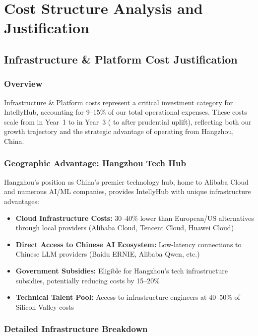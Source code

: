 \documentclass[11pt, a4paper, oneside]{article}
\begin{document}
\restoregeometry
\endgroup

\section{Cost Structure Analysis and Justification}
\label{sec:cost-analysis}

\subsection{Infrastructure \& Platform Cost Justification}

\subsubsection{Overview}
Infrastructure \& Platform costs represent a critical investment category for IntellyHub, accounting for 9--15\% of our total operational expenses. These costs scale from  in Year~1 to  in Year~3 ( to  after prudential uplift), reflecting both our growth trajectory and the strategic advantage of operating from Hangzhou, China.

\subsubsection{Geographic Advantage: Hangzhou Tech Hub}
Hangzhou's position as China's premier technology hub, home to Alibaba Cloud and numerous AI/ML companies, provides IntellyHub with unique infrastructure advantages:

\begin{itemize}
    \item \textbf{Cloud Infrastructure Costs:} 30--40\% lower than European/US alternatives through local providers (Alibaba Cloud, Tencent Cloud, Huawei Cloud)
    \item \textbf{Direct Access to Chinese AI Ecosystem:} Low-latency connections to Chinese LLM providers (Baidu ERNIE, Alibaba Qwen, etc.)
    \item \textbf{Government Subsidies:} Eligible for Hangzhou's tech infrastructure subsidies, potentially reducing costs by 15--20\%
    \item \textbf{Technical Talent Pool:} Access to infrastructure engineers at 40--50\% of Silicon Valley costs
\end{itemize}

\subsubsection{Detailed Infrastructure Breakdown}
\end{document}

